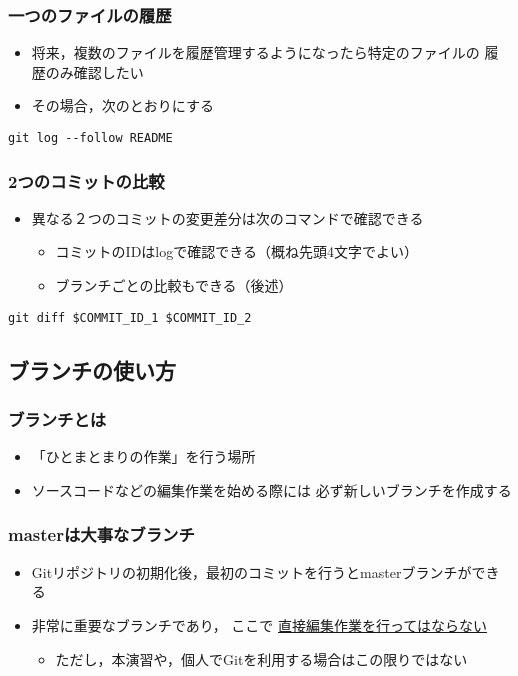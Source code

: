 \documentclass[a4paper,twoside,twocolumn]{bxjsarticle}
\begin{document}
\subsubsection{一つのファイルの履歴}
\label{sec-1-5-2}
\begin{itemize}
\item 将来，複数のファイルを履歴管理するようになったら特定のファイルの
履歴のみ確認したい
\item その場合，次のとおりにする
\end{itemize}

\begin{verbatim}
git log --follow README
\end{verbatim}

\subsubsection{2つのコミットの比較}
\label{sec-1-5-3}
\begin{itemize}
\item 異なる２つのコミットの変更差分は次のコマンドで確認できる
\begin{itemize}
\item コミットのIDはlogで確認できる（概ね先頭4文字でよい）
\item ブランチごとの比較もできる（後述）
\end{itemize}
\end{itemize}

\begin{verbatim}
git diff $COMMIT_ID_1 $COMMIT_ID_2
\end{verbatim}


\subsection{ブランチの使い方}
\label{sec-1-6}
\subsubsection{ブランチとは}
\label{sec-1-6-1}
\begin{itemize}
\item 「ひとまとまりの作業」を行う場所
\item ソースコードなどの編集作業を始める際には
必ず新しいブランチを作成する
\end{itemize}

\subsubsection{masterは大事なブランチ}
\label{sec-1-6-2}
\begin{itemize}
\item Gitリポジトリの初期化後，最初のコミットを行うとmasterブランチができる
\item 非常に重要なブランチであり，
ここで \uline{直接編集作業を行ってはならない}
\begin{itemize}
\item ただし，本演習や，個人でGitを利用する場合はこの限りではない
\end{itemize}
\end{itemize}
\end{document}
